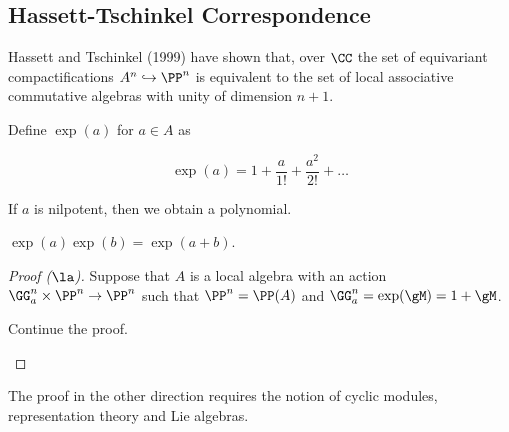 \documentclass[11pt]{scrartcl}
\begin{document}
  \subsection{Hassett-Tschinkel Correspondence}

  Hassett and Tschinkel (1999) have shown that, over $\CC$ the set of
  equivariant compactifications $A^{n} \hookrightarrow \PP^{n}$ is
  equivalent to the set of local associative commutative algebras with
  unity of dimension $n+1$.

  Define $\exp(a)$ for $a\in A$ as
  
  \begin{equation*}
    \exp(a) = 1 + \frac{a}{1!} + \frac{a^{2}}{2!} + \dots
  \end{equation*}

  If $a$ is nilpotent, then we obtain a polynomial.

  \begin{exercise}

    $\exp(a)\exp(b) = \exp(a+b)$.

  \end{exercise}

  \begin{proof}[Proof ($\la$)]
    \hfill

    Suppose that $A$ is a local algebra with an action
    $\GG_{a}^{n}\times \PP^{n} \to \PP^{n}$ such that
    $\PP^{n} = \PP(A)$ and $\GG_{a}^{n} = \exp(\gM) = 1+\gM$.

    \begin{exercise}

      Continue the proof.

    \end{exercise}
  \end{proof}

  The proof in the other direction requires the notion of cyclic
  modules, representation theory and Lie algebras.




    
    

  

  
\end{document}
